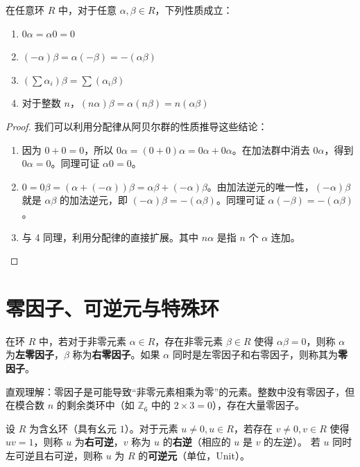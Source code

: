 \documentclass[11pt]{article}
\begin{document}
\begin{cnproperty}[环的基本运算性质]
在任意环 $R$ 中，对于任意 $\alpha, \beta \in R$，下列性质成立：
\begin{enumerate}
    \item $0\alpha = \alpha 0 = 0$
    \item $(-\alpha)\beta = \alpha(-\beta) = -(\alpha\beta)$
    \item $(\sum \alpha_i)\beta = \sum (\alpha_i\beta)$
    \item 对于整数 $n$，$(n\alpha)\beta = \alpha(n\beta) = n(\alpha\beta)$
\end{enumerate}
\end{cnproperty}
\begin{proof}
我们可以利用分配律从阿贝尔群的性质推导这些结论：
\begin{enumerate}
    \item 因为 $0+0=0$，所以 $0\alpha = (0+0)\alpha = 0\alpha + 0\alpha$。在加法群中消去 $0\alpha$，得到 $0\alpha = 0$。同理可证 $\alpha0=0$。
    \item $0 = 0\beta = (\alpha + (-\alpha))\beta = \alpha\beta + (-\alpha)\beta$。由加法逆元的唯一性，$(-\alpha)\beta$ 就是 $\alpha\beta$ 的加法逆元，即 $(-\alpha)\beta = -(\alpha\beta)$。同理可证 $\alpha(-\beta) = -(\alpha\beta)$。
    \item 与 4 同理，利用分配律的直接扩展。其中 $n\alpha$ 是指 $n$ 个 $\alpha$ 连加。
\end{enumerate}
\end{proof}

\section{零因子、可逆元与特殊环}

\begin{cndefinition}
在环 $R$ 中，若对于非零元素 $\alpha \in R$，存在非零元素 $\beta \in R$ 使得 $\alpha\beta = 0$，则称 $\alpha$ 为\textbf{左零因子}，$\beta$ 称为\textbf{右零因子}。如果 $\alpha$ 同时是左零因子和右零因子，则称其为\textbf{零因子}。
\end{cndefinition}

直观理解：零因子是可能导致“非零元素相乘为零”的元素。整数中没有零因子，但在模合数 $n$ 的剩余类环中（如 $\mathbb{Z}_6$ 中的 $2 \times 3 = 0$），存在大量零因子。

\begin{cndefinition}
设 $R$ 为含幺环（具有幺元 $1$）。对于元素 $u \neq 0, u \in R$，若存在 $v \neq 0, v \in R$ 使得 $uv = 1$，则称 $u$ 为\textbf{右可逆}，$v$ 称为 $u$ 的\textbf{右逆}（相应的 $u$ 是 $v$ 的左逆）。
若 $u$ 同时左可逆且右可逆，则称 $u$ 为 $R$ 的\textbf{可逆元}（单位，Unit）。
\end{cndefinition}
\end{document}

